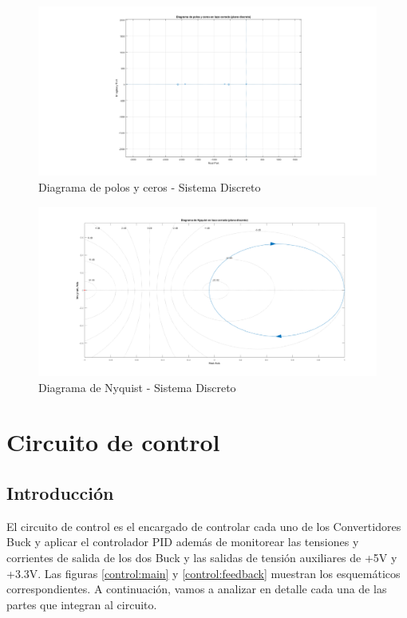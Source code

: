 \documentclass[12pt]{report}
\begin{document}
	\begin{figure}
		\centering
		\includegraphics[width=\textwidth,height=\textheight,keepaspectratio]{buck_polos_ceros_discrete}
		\caption{Diagrama de polos y ceros - Sistema Discreto}
		\label{buck:polos_ceros_discrete}
	\end{figure}
	
	\begin{figure}
		\centering
		\includegraphics[width=\textwidth,height=\textheight,keepaspectratio]{buck_nyquist_discrete} 
		\caption{Diagrama de Nyquist - Sistema Discreto}
		\label{buck:nyquist_discrete}
	\end{figure}
	
\chapter{Circuito de control}

\section{Introducción}

El circuito de control es el encargado de controlar cada uno de los Convertidores Buck y aplicar el controlador PID además de monitorear las tensiones y corrientes de salida de los dos Buck y las salidas de tensión auxiliares de +5V y +3.3V. Las figuras \ref{control:main} y \ref{control:feedback} muestran los esquemáticos correspondientes. A continuación, vamos a analizar en detalle cada una de las partes que integran al circuito.
\end{document}
